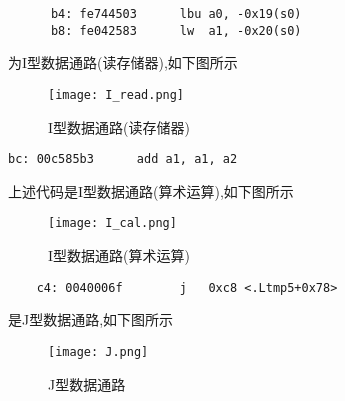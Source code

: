 \documentclass{ctexart}
\begin{document}
\begin{verbatim}
      b4: fe744503     	lbu	a0, -0x19(s0)
      b8: fe042583     	lw	a1, -0x20(s0)
\end{verbatim}

为I型数据通路(读存储器),如下图所示
\begin{figure}[H]
    \centering
    \texttt{[image: I\_read.png]} %
    \caption{I型数据通路(读存储器)}
    \label{I型数据通路(读存储器)}
\end{figure}
\begin{verbatim}
bc: 00c585b3      add a1, a1, a2
\end{verbatim}

上述代码是I型数据通路(算术运算),如下图所示
\begin{figure}[H]
    \centering
    \texttt{[image: I\_cal.png]} %
    \caption{I型数据通路(算术运算)}
    \label{I型数据通路(算术运算)}
\end{figure}
\begin{verbatim}
    c4: 0040006f     	j	0xc8 <.Ltmp5+0x78>
\end{verbatim}

是J型数据通路,如下图所示
\begin{figure}[H]
    \centering
    \texttt{[image: J.png]} %
    \caption{J型数据通路}
    \label{J型数据通路}
\end{figure}
\end{document}
